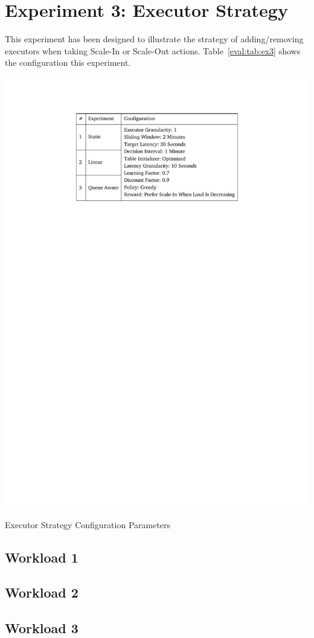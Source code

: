 \clearpage
\section{Experiment 3: Executor Strategy}
This experiment has been designed to illustrate the strategy of adding/removing executors when taking Scale-In or Scale-Out actions. Table~\ref{eval:tab:ex3} shows the configuration this experiment.
\begin{table}[h]
    \includegraphics[clip,trim=4.7cm 21.18cm 4.7cm 2.5cm]{tables/ex3.pdf}
    \centering
    \caption{Executor Strategy Configuration Parameters}
    \label{eval:tab:ex3}
\end{table}

\subsection{Workload 1}

\subsection{Workload 2}

\subsection{Workload 3}